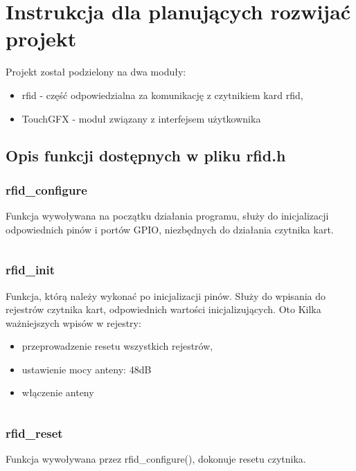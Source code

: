 \documentclass[12pt,hidelinks]{article}
\begin{document}
    \section{Instrukcja dla planujących rozwijać projekt}
    \vspace{10.5cm}

    Projekt został podzielony na dwa moduły:
    \begin{itemize}
        \item rfid - część odpowiedzialna za komunikację z czytnikiem kard rfid,
        \item TouchGFX - moduł związany z interfejsem użytkownika
    \end{itemize}

    \subsection{Opis funkcji dostępnych w pliku rfid.h}

    \subsubsection{rfid\_configure}
    Funkcja wywoływana na początku działania programu, służy do inicjalizacji odpowiednich pinów i portów GPIO, niezbędnych do działania czytnika kart.
    \inputminted[linenos=true]{c++}{rfid_code/rfid_configure.c}

    \subsubsection{rfid\_init}
    Funkcja, którą należy wykonać po inicjalizacji pinów. Służy do wpisania do rejestrów czytnika kart, odpowiednich wartości inicjalizujących. Oto Kilka ważniejszych wpisów w rejestry:
    \begin{itemize}
        \item przeprowadzenie resetu wszystkich rejestrów,
        \item ustawienie mocy anteny: 48dB
        \item włączenie anteny
    \end{itemize}
    \inputminted[linenos=true]{c++}{rfid_code/rfid_init.c}


    \subsubsection{rfid\_reset}
    Funkcja wywoływana przez rfid\_configure(), dokonuje resetu czytnika.
    \inputminted[linenos=true]{c++}{rfid_code/rfid_reset.c}
\end{document}

